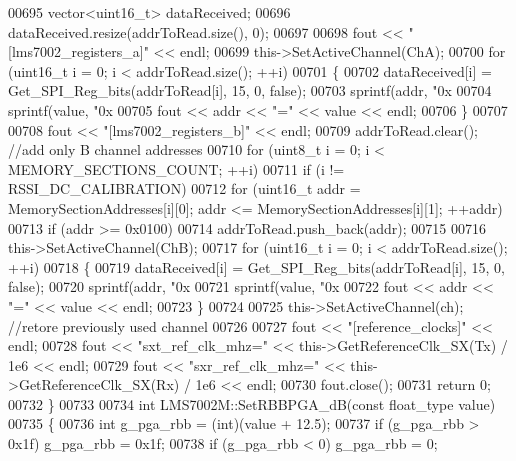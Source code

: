 \begin{DoxyCode}
{{{{{{{{{{{{{{{{{{{{{00695     vector<uint16\_t> dataReceived;
00696     dataReceived.resize(addrToRead.size(), 0);
00697 
00698     fout << \textcolor{stringliteral}{"[lms7002\_registers\_a]"} << endl;
00699     this->SetActiveChannel(ChA);
00700     \textcolor{keywordflow}{for} (uint16\_t i = 0; i < addrToRead.size(); ++i)
00701     \{
00702         dataReceived[i] = Get_SPI_Reg_bits(addrToRead[i], 15, 0, \textcolor{keyword}{false});
00703         sprintf(addr, \textcolor{stringliteral}{"0x%
00704         sprintf(value, \textcolor{stringliteral}{"0x%
00705         fout << addr << \textcolor{stringliteral}{"="} << value << endl;
00706     \}
00707 
00708     fout << \textcolor{stringliteral}{"[lms7002\_registers\_b]"} << endl;
00709     addrToRead.clear(); \textcolor{comment}{//add only B channel addresses}
00710     \textcolor{keywordflow}{for} (uint8\_t i = 0; i < MEMORY_SECTIONS_COUNT; ++i)
00711         \textcolor{keywordflow}{if} (i != RSSI_DC_CALIBRATION)
00712             \textcolor{keywordflow}{for} (uint16\_t addr = MemorySectionAddresses[i][0]; addr <= 
      MemorySectionAddresses[i][1]; ++addr)
00713                 \textcolor{keywordflow}{if} (addr >= 0x0100)
00714                     addrToRead.push\_back(addr);
00715 
00716     this->SetActiveChannel(ChB);
00717     \textcolor{keywordflow}{for} (uint16\_t i = 0; i < addrToRead.size(); ++i)
00718     \{
00719         dataReceived[i] = Get_SPI_Reg_bits(addrToRead[i], 15, 0, \textcolor{keyword}{false});
00720         sprintf(addr, \textcolor{stringliteral}{"0x%
00721         sprintf(value, \textcolor{stringliteral}{"0x%
00722         fout << addr << \textcolor{stringliteral}{"="} << value << endl;
00723     \}
00724 
00725     this->SetActiveChannel(ch); \textcolor{comment}{//retore previously used channel}
00726 
00727     fout << \textcolor{stringliteral}{"[reference\_clocks]"} << endl;
00728     fout << \textcolor{stringliteral}{"sxt\_ref\_clk\_mhz="} << this->GetReferenceClk_SX(Tx) / 1e6 << endl;
00729     fout << \textcolor{stringliteral}{"sxr\_ref\_clk\_mhz="} << this->GetReferenceClk_SX(Rx) / 1e6 << endl;
00730     fout.close();
00731     \textcolor{keywordflow}{return} 0;
00732 \}
00733 
00734 \textcolor{keywordtype}{int} LMS7002M::SetRBBPGA_dB(\textcolor{keyword}{const} float_type value)
00735 \{
00736     \textcolor{keywordtype}{int} g\_pga\_rbb = (int)(value + 12.5);
00737     \textcolor{keywordflow}{if} (g\_pga\_rbb > 0x1f) g\_pga\_rbb = 0x1f;
00738     \textcolor{keywordflow}{if} (g\_pga\_rbb < 0) g\_pga\_rbb = 0;
}}}}}}}}}}}}}}}}}}}}}}}}}
\end{DoxyCode}
